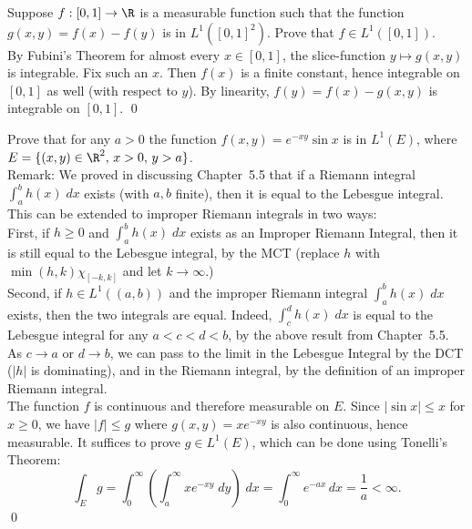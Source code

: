 \begin{hwsol}
Suppose $f: [0, 1] \to \R$ is a measurable function such that the function $g(x,y)= f(x) - f(y)$ is in $L^1([0, 1]^2)$. Prove that $f\in L^1([0, 1])$. \\

\pf By Fubini's Theorem for almost every $x\in [0, 1]$, the slice-function $y \mapsto g(x,y)$ is integrable. Fix such an $x$. Then $f(x)$ is a finite constant, hence integrable on $[0, 1]$ as well (with respect to $y$). By linearity, $f(y)= f(x) - g(x, y)$ is integrable on $[0, 1]$. \qed \\
\end{hwsol}


\begin{hwsol}
Prove that for any $a > 0$ the function $f(x,y)= e^{-xy} \sin x$ is in $L^1(E)$, where $E= \{ (x, y) \in \R^2, \, x > 0, \, y > a \}$. \\

\noindent Remark: We proved in discussing Chapter~5.5 that if a Riemann integral $\int_a^b h(x) \;dx$ exists (with $a,b$ finite), then it is equal to the Lebesgue integral. This can be extended to improper Riemann integrals in two ways: \\

\noindent First, if $h \geq 0$ and $\int_a^b h(x) \;dx$ exists as an Improper Riemann Integral, then it is still equal to the Lebesgue integral, by the MCT (replace $h$ with $\min(h, k) \chi_{[-k, k]}$ and let $k \to \infty$.) \\

\noindent Second, if $h \in L^1((a, b))$ and the improper Riemann integral $\int_a^b h(x)\;dx$  exists, then the two integrals are equal. Indeed, $\int_c^d h(x) \;dx$ is equal to the Lebesgue integral for any $a<c<d<b$, by the above result from Chapter~5.5. As $c \to a$ or $d \to b$, we can pass to the limit in the Lebesgue Integral by the DCT ($|h|$ is dominating), and in the Riemann integral, by the definition of an improper Riemann integral. \\

\pf The function $f$ is continuous and therefore measurable on $E$. Since $|\sin x| \leq x$ for $x \geq 0$, we have $|f| \leq g$ where $g(x,y)= xe^{-xy}$ is also continuous, hence measurable. It suffices to prove $g \in L^1(E)$, which can be done using Tonelli's Theorem:
        \[
        \int_E g= \int_0^\infty \left( \int_a^{\infty} xe^{-xy} \;dy \right) \;dx= \int_0^\infty e^{-ax}\,dx= \frac{1}{a} < \infty.
        \] \qed \\
\end{hwsol}


